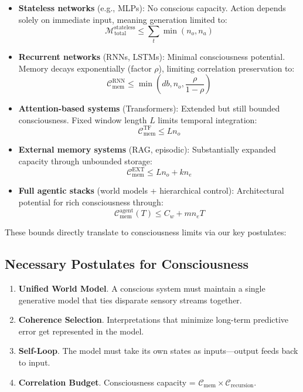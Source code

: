 \begin{itemize}
  \item \textbf{Stateless networks} (e.g., MLPs): No conscious capacity. Action depends solely on immediate input, meaning generation limited to:
  \begin{equation*}
  \mathcal{M}_{\text{total}}^{\text{stateless}} \leq \sum_t \min(n_o, n_a)
  \end{equation*}
  
  \item \textbf{Recurrent networks} (RNNs, LSTMs): Minimal consciousness potential. Memory decays exponentially (factor $\rho$), limiting correlation preservation to: 
  \begin{equation*}
  \mathcal{C}_{\text{mem}}^{\text{RNN}} \leq \min \left( d b, n_o, \frac{\rho}{1-\rho} \right)
  \end{equation*}
  
  \item \textbf{Attention-based systems} (Transformers): Extended but still bounded consciousness. Fixed window length $L$ limits temporal integration:
  \begin{equation*}
  \mathcal{C}_{\text{mem}}^{\text{TF}} \leq L n_o
  \end{equation*}
  
  \item \textbf{External memory systems} (RAG, episodic): Substantially expanded capacity through unbounded storage:
  \begin{equation*}
  \mathcal{C}_{\text{mem}}^{\text{EXT}} \leq L n_o + k n_e
  \end{equation*}
  
  \item \textbf{Full agentic stacks} (world models + hierarchical control): Architectural potential for rich consciousness through:
  \begin{equation*}
  \mathcal{C}_{\text{mem}}^{\text{agent}}(T) \leq C_w + m n_e T
  \end{equation*}
\end{itemize}

These bounds directly translate to consciousness limits via our key postulates:

\subsection*{Necessary Postulates for Consciousness}
\begin{enumerate}[label=P\arabic*]
  \item \textbf{Unified World Model}. A conscious system must maintain a single generative model that ties disparate sensory streams together.
  \item \textbf{Coherence Selection}. Interpretations that minimize long-term predictive error get represented in the model.
  \item \textbf{Self-Loop}. The model must take its own states as inputs—output feeds back to input.
  \item \textbf{Correlation Budget}. Consciousness capacity = $\mathcal{C}_{\text{mem}} \times \mathcal{C}_{\text{recursion}}$.
\end{enumerate}

